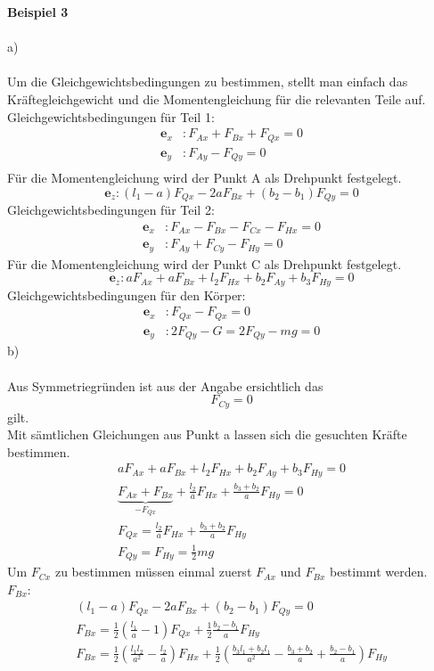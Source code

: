 \textbf{Beispiel 3} \\ \\
a) \\ \\
Um die Gleichgewichtsbedingungen zu bestimmen, stellt man einfach das Kräftegleichgewicht und die Momentengleichung für die relevanten Teile auf. \\
Gleichgewichtsbedingungen für Teil 1:
\begin{align*}
	\textbf{e}_x &: F_{Ax} + F_{Bx} + F_{Qx} = 0 \\
	\textbf{e}_y &: F_{Ay} - F_{Qy} = 0 \\
\end{align*}
Für die Momentengleichung wird der Punkt A als Drehpunkt festgelegt.
\[
	\textbf{e}_z : \left(l_1 - a\right)F_{Qx} - 2aF_{Bx} + (b_2 - b_1)F_{Qy} = 0
\]
Gleichgewichtsbedingungen für Teil 2:
\begin{align*}
	\textbf{e}_x &: F_{Ax} - F_{Bx} - F_{Cx} - F_{Hx} = 0 \\
	\textbf{e}_y &: F_{Ay} + F_{Cy} - F_{Hy} = 0
\end{align*}
Für die Momentengleichung wird der Punkt C als Drehpunkt festgelegt.
\[
	\textbf{e}_z : aF_{Ax} + aF_{Bx} + l_2F_{Hx} + b_2F_{Ay} + b_3F_{Hy} = 0
\]
Gleichgewichtsbedingungen für den Körper:
\begin{align*}
	\textbf{e}_x &: F_{Qx} - F_{Qx} = 0 \\
	\textbf{e}_y &: 2F_{Qy} - G = 2F_{Qy} - mg = 0
\end{align*}
\newpage
\noindent
b) \\ \\
Aus Symmetriegründen ist aus der Angabe ersichtlich das 
\[
	F_{Cy} = 0
\]
gilt. \\
Mit sämtlichen Gleichungen aus Punkt a lassen sich die gesuchten Kräfte bestimmen.
\begin{align*}
	aF_{Ax} + aF_{Bx} + l_2F_{Hx} + b_2F_{Ay} + b_3F_{Hy} = 0 \\
	\underbrace{F_{Ax} + F_{Bx}}_{-F_{Qx}} + \frac{l_2}{a}F_{Hx} + \frac{b_3 + b_2}{a} F_{Hy} = 0 \\
	F_{Qx} =  \frac{l_2}{a}F_{Hx} + \frac{b_3 + b_2}{a} F_{Hy} \\
	F_{Qy} = F_{Hy} = \frac{1}{2} mg
\end{align*}
Um $F_{Cx}$ zu bestimmen müssen einmal zuerst $F_{Ax}$ und $F_{Bx}$ bestimmt werden. \\
$F_{Bx}$:
\begin{align*}
	\left(l_1 - a\right)F_{Qx} - 2aF_{Bx} + (b_2 - b_1)F_{Qy} = 0 \\
	F_{Bx} = \frac{1}{2}\left(\frac{l_1}{a} - 1\right)F_{Qx} + \frac{1}{2}\frac{b_2 - b_1}{a}F_{Hy} \\
	F_{Bx} = \frac{1}{2}\left(\frac{l_1l_2}{a^2} - \frac{l_2}{a}\right)F_{Hx} + \frac{1}{2}\left(\frac{b_3l_1 + b_2l_1}{a^2} - \frac{b_3 + b_2}{a} + \frac{b_2 - b_1}{a}\right) F_{Hy} \\
\end{align*}
